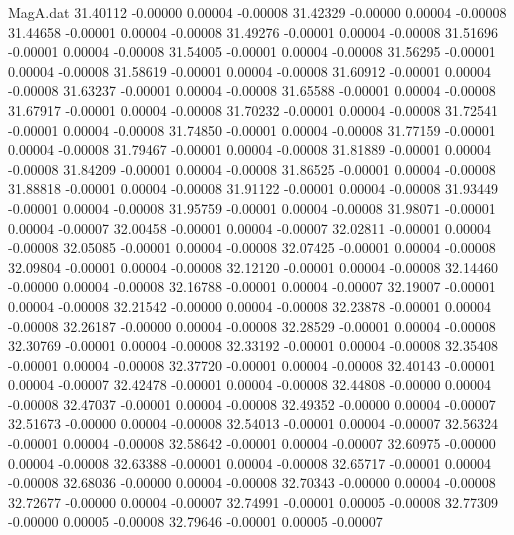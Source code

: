 \begin{filecontents}{MagA.dat}
  31.40112   -0.00000    0.00004   -0.00008
  31.42329   -0.00000    0.00004   -0.00008
  31.44658   -0.00001    0.00004   -0.00008
  31.49276   -0.00001    0.00004   -0.00008
  31.51696   -0.00001    0.00004   -0.00008
  31.54005   -0.00001    0.00004   -0.00008
  31.56295   -0.00001    0.00004   -0.00008
  31.58619   -0.00001    0.00004   -0.00008
  31.60912   -0.00001    0.00004   -0.00008
  31.63237   -0.00001    0.00004   -0.00008
  31.65588   -0.00001    0.00004   -0.00008
  31.67917   -0.00001    0.00004   -0.00008
  31.70232   -0.00001    0.00004   -0.00008
  31.72541   -0.00001    0.00004   -0.00008
  31.74850   -0.00001    0.00004   -0.00008
  31.77159   -0.00001    0.00004   -0.00008
  31.79467   -0.00001    0.00004   -0.00008
  31.81889   -0.00001    0.00004   -0.00008
  31.84209   -0.00001    0.00004   -0.00008
  31.86525   -0.00001    0.00004   -0.00008
  31.88818   -0.00001    0.00004   -0.00008
  31.91122   -0.00001    0.00004   -0.00008
  31.93449   -0.00001    0.00004   -0.00008
  31.95759   -0.00001    0.00004   -0.00008
  31.98071   -0.00001    0.00004   -0.00007
  32.00458   -0.00001    0.00004   -0.00007
  32.02811   -0.00001    0.00004   -0.00008
  32.05085   -0.00001    0.00004   -0.00008
  32.07425   -0.00001    0.00004   -0.00008
  32.09804   -0.00001    0.00004   -0.00008
  32.12120   -0.00001    0.00004   -0.00008
  32.14460   -0.00000    0.00004   -0.00008
  32.16788   -0.00001    0.00004   -0.00007
  32.19007   -0.00001    0.00004   -0.00008
  32.21542   -0.00000    0.00004   -0.00008
  32.23878   -0.00001    0.00004   -0.00008
  32.26187   -0.00000    0.00004   -0.00008
  32.28529   -0.00001    0.00004   -0.00008
  32.30769   -0.00001    0.00004   -0.00008
  32.33192   -0.00001    0.00004   -0.00008
  32.35408   -0.00001    0.00004   -0.00008
  32.37720   -0.00001    0.00004   -0.00008
  32.40143   -0.00001    0.00004   -0.00007
  32.42478   -0.00001    0.00004   -0.00008
  32.44808   -0.00000    0.00004   -0.00008
  32.47037   -0.00001    0.00004   -0.00008
  32.49352   -0.00000    0.00004   -0.00007
  32.51673   -0.00000    0.00004   -0.00008
  32.54013   -0.00001    0.00004   -0.00007
  32.56324   -0.00001    0.00004   -0.00008
  32.58642   -0.00001    0.00004   -0.00007
  32.60975   -0.00000    0.00004   -0.00008
  32.63388   -0.00001    0.00004   -0.00008
  32.65717   -0.00001    0.00004   -0.00008
  32.68036   -0.00000    0.00004   -0.00008
  32.70343   -0.00000    0.00004   -0.00008
  32.72677   -0.00000    0.00004   -0.00007
  32.74991   -0.00001    0.00005   -0.00008
  32.77309   -0.00000    0.00005   -0.00008
  32.79646   -0.00001    0.00005   -0.00007

\end{filecontents}
